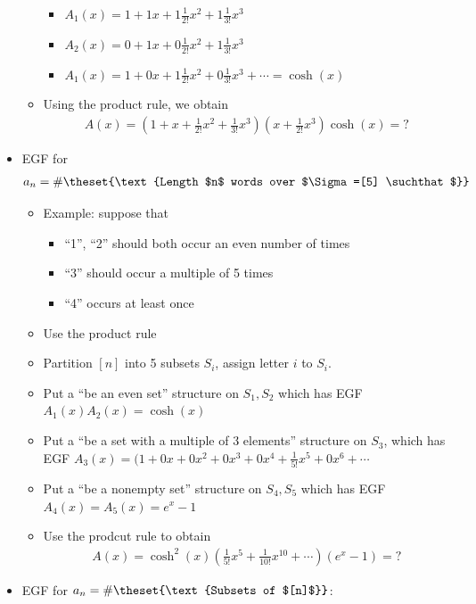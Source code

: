 \begin{itemize}
\begin{itemize}
    \begin{itemize}
    \tightlist
    \item
      \(A_1(x) = 1 + 1x + 1\frac{1}{2!}x^2 + 1\frac{1}{3!}x^3\)
    \item
      \(A_2(x) = 0 + 1x + 0\frac{1}{2!}x^2 + 1\frac{1}{3!}x^3\)
    \item
      \(A_1(x) = 1 + 0x + 1\frac{1}{2!}x^2 + 0\frac{1}{3!}x^3 + \cdots = \cosh(x)\)
    \end{itemize}
  \item
    Using the product rule, we obtain
    \begin{align*}
    A(x) = (1 +x + \frac{1}{2!}x^2 + \frac{1}{3!}x^3)(x + \frac{1}{2!}x^3)\cosh(x) = ?
    \end{align*}
  \end{itemize}
\item
  EGF for
  \begin{align*}a_n = \#\theset{\text{Length $n$ words over $\Sigma =[5] \suchthat$}}\end{align*}

  \begin{itemize}
  \tightlist
  \item
    Example: suppose that

    \begin{itemize}
    \tightlist
    \item
      ``1'', ``2'' should both occur an even number of times
    \item
      ``3'' should occur a multiple of 5 times
    \item
      ``4'' occurs at least once
    \end{itemize}
  \item
    Use the product rule
  \item
    Partition \([n]\) into 5 subsets \(S_i\), assign letter \(i\) to
    \(S_i\).
  \item
    Put a ``be an even set'' structure on \(S_ 1, S_2\) which has EGF
    \(A_1(x) A_2(x) = \cosh(x)\)
  \item
    Put a ``be a set with a multiple of 3 elements'' structure on
    \(S_3\), which has EGF
    \(A_3(x) = (1 + 0x + 0x^2 + 0x^3 + 0x^4 + \frac{1}{5!}x^5 + 0x^6 + \cdots\)
  \item
    Put a ``be a nonempty set'' structure on \(S_4, S_5\) which has EGF
    \(A_4(x) = A_5(x) = e^x - 1\)
  \item
    Use the prodcut rule to obtain
    \begin{align*}
    A(x) = \cosh^2(x)\left(\frac{1}{5!}x^5 + \frac{1}{10!}x^{10} + \cdots \right)(e^x-1) = ?
    \end{align*}
  \end{itemize}
\item
  EGF for \(a_n = \#\theset{\text{Subsets of $[n]$}}\):


\end{itemize}
